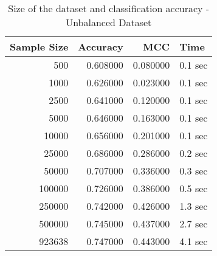 \begin{table}
\caption{Size of the dataset and classification accuracy - Unbalanced Dataset}
\label{tab:unbal_size}
\begin{tabular}{rrrl}
\toprule
Sample Size & Accuracy & MCC & Time \\
\midrule
500 & 0.608000 & 0.080000 & 0.1 sec \\
1000 & 0.626000 & 0.023000 & 0.1 sec \\
2500 & 0.641000 & 0.120000 & 0.1 sec \\
5000 & 0.646000 & 0.163000 & 0.1 sec \\
10000 & 0.656000 & 0.201000 & 0.1 sec \\
25000 & 0.686000 & 0.286000 & 0.2 sec \\
50000 & 0.707000 & 0.336000 & 0.3 sec \\
100000 & 0.726000 & 0.386000 & 0.5 sec \\
250000 & 0.742000 & 0.426000 & 1.3 sec \\
500000 & 0.745000 & 0.437000 & 2.7 sec \\
923638 & 0.747000 & 0.443000 & 4.1 sec \\
\bottomrule
\end{tabular}
\end{table}
